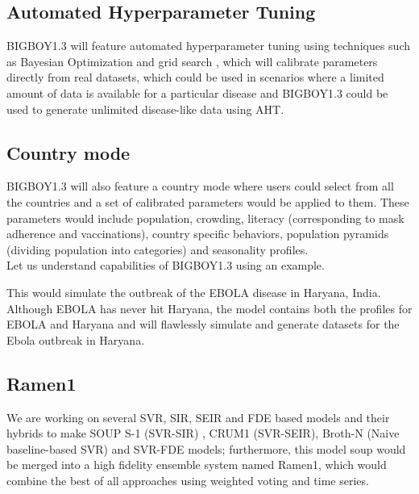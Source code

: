 \documentclass[11pt,a4paper]{article}
\theoremstyle{remark}\newtheorem{remark}{Remark}
\begin{document}
\subsection{Automated Hyperparameter Tuning}
BIGBOY1.3 will feature automated hyperparameter tuning using techniques such as Bayesian Optimization and grid search \cite{snoek2012practical}, which will calibrate parameters directly from real datasets, which could be used in scenarios where a limited amount of data is available for a particular disease and BIGBOY1.3 could be used to generate unlimited disease-like data using AHT. 
\subsection{Country mode}
BIGBOY1.3 will also feature a country mode where users could select from all the countries and a set of calibrated parameters would be applied to them. These parameters would include population, crowding, literacy (corresponding to mask adherence and vaccinations), country specific behaviors, population pyramids (dividing population into categories) and seasonality profiles. \\
Let us understand capabilities of BIGBOY1.3 using an example.
\begin{center}
\end{center}
This would simulate the outbreak of the EBOLA disease in Haryana, India. Although EBOLA has never hit Haryana, the model contains both the profiles for EBOLA and Haryana and will flawlessly simulate and generate datasets for the Ebola outbreak in Haryana.
\subsection{Ramen1}
We are working on several SVR, SIR, SEIR and FDE \cite{duan2020svr,li2020fractional} based models and their hybrids to make SOUP S-1 (SVR-SIR) , CRUM1 (SVR-SEIR), Broth-N (Naive baseline-based SVR) and SVR-FDE models; furthermore, this model soup would be merged into a high fidelity ensemble system named Ramen1, which would combine the best of all approaches using weighted voting and time series. 
\end{document}
